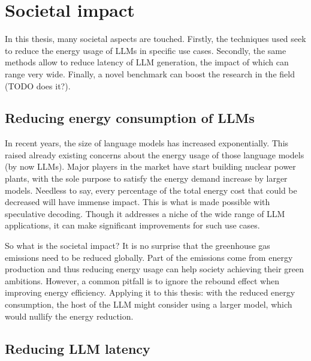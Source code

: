 
\chapter{Societal impact}
\label{sec:societal_impact}

In this thesis, many societal aspects are touched. Firstly, the techniques used seek to reduce the energy usage of LLMs in specific use cases. Secondly, the same methods allow to reduce latency of LLM generation, the impact of which can range very wide. Finally, a novel benchmark can boost the research in the field (TODO does it?).

\section{Reducing energy consumption of LLMs}

In recent years, the size of language models has increased exponentially. This raised already existing concerns about the energy usage of those language models (by now LLMs). Major players in the market have start building nuclear power plants, with the sole purpose to satisfy the energy demand increase by larger models. Needless to say, every percentage of the total energy cost that could be decreased will have immense impact. This is what is made possible with speculative decoding. Though it addresses a niche of the wide range of LLM applications, it can make significant improvements for such use cases. 

So what is the societal impact? It is no surprise that the greenhouse gas emissions need to be reduced globally. Part of the emissions come from energy production and thus reducing energy usage can help society achieving their green ambitions. However, a common pitfall is to ignore the rebound effect when improving energy efficiency. Applying it to this thesis: with the reduced energy consumption, the host of the LLM might consider using a larger model, which would nullify the energy reduction. 

\section{Reducing LLM latency}

